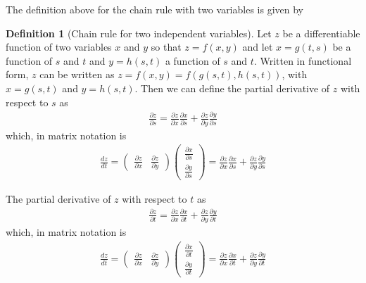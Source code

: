 \documentclass[
]{book}
\theoremstyle{definition}
\newtheorem{definition}{Definition}[chapter]
\theoremstyle{definition}
\theoremstyle{definition}
\theoremstyle{remark}
\begin{document}
The definition above for the chain rule with two variables is given by
\begin{definition}[Chain rule for two independent variables]
\protect\hypertarget{def:unnamed-chunk-285}{}{\label{def:unnamed-chunk-285} {} }Let \(z\) be a differentiable function of two variables \(x\) and \(y\) so that \(z = f(x, y)\) and let \(x=g(t, s)\) be a function of \(s\) and \(t\) and \(y=h(s, t)\) a function of \(s\) and \(t\). Written in functional form, \(z\) can be written as \(z = f(x, y) = f(g(s, t), h(s, t))\), with \(x=g(s, t)\) and \(y=h(s, t)\). Then we can define the partial derivative of \(z\) with respect to \(s\) as
\[
\begin{aligned}
\frac{\partial z}{\partial s} = \frac{\partial z}{ \partial x}\frac{\partial x}{\partial s} + \frac{\partial z}{\partial y}\frac{\partial y}{\partial s}
\end{aligned}
\]
which, in matrix notation is
\[
\begin{aligned}
\frac{dz}{dt} = \begin{pmatrix} \frac{\partial z}{ \partial x} & \frac{\partial z}{\partial y} \end{pmatrix} \begin{pmatrix} \frac{\partial x}{\partial s} \\  \frac{\partial y}{\partial s} \end{pmatrix} = \frac{\partial z}{ \partial x}\frac{\partial x}{\partial s} + \frac{\partial z}{\partial y}\frac{\partial y}{\partial s}
\end{aligned}
\]

The partial derivative of \(z\) with respect to \(t\) as
\[
\begin{aligned}
\frac{\partial z}{\partial t} = \frac{\partial z}{ \partial x}\frac{\partial x}{\partial t} + \frac{\partial z}{\partial y}\frac{\partial y}{\partial t}
\end{aligned}
\]
which, in matrix notation is
\[
\begin{aligned}
\frac{dz}{dt} = \begin{pmatrix} \frac{\partial z}{ \partial x} & \frac{\partial z}{\partial y} \end{pmatrix} \begin{pmatrix} \frac{\partial x}{\partial t} \\  \frac{\partial y}{\partial t} \end{pmatrix} = \frac{\partial z}{ \partial x}\frac{\partial x}{\partial t} + \frac{\partial z}{\partial y}\frac{\partial y}{\partial t}
\end{aligned}
\]
\end{definition}
\end{document}
